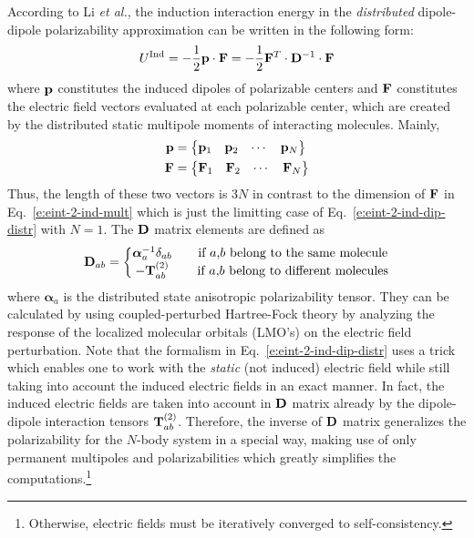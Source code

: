 \documentclass[a4paper,titlepage,twoside,fleqn,12pt]{book}
\newcommand{\BM}[1]{\bm{#1}}
\begin{document}
\begin{refsection}
According to Li \emph{et al.},\citep{Li.Netzloff.Gordon.JCP.2006} 
the induction interaction energy in the 
\emph{distributed} dipole\hyp{}dipole polarizability approximation 
can be written in the following form:
%
\begin{equation} \label{e:eint-2-ind-dip-distr}
U^{\rm Ind} = - \frac{1}{2} {\bf p} \cdot {\bf F} = - \frac{1}{2} {\bf F}^T \cdot {\bf D}^{-1} \cdot {\bf F}
\end{equation}
%
where ${\bf p}$ constitutes the induced dipoles of 
polarizable centers and ${\bf F}$ constitutes the electric field 
vectors evaluated at each polarizable center, which are created by the 
distributed static multipole moments of interacting molecules.
Mainly,
%
\begin{subequations} \label{e:pf}
\begin{align}
 {\bf p} &= 
 \begin{Bmatrix}
  {\bf p}_1 & {\bf p}_2 & \cdots & {\bf p}_N
 \end{Bmatrix} \\
 {\bf F}&= 
 \begin{Bmatrix}
  {\bf F}_1 & {\bf F}_2 & \cdots & {\bf F}_N
 \end{Bmatrix}
\end{align}
\end{subequations}
%
Thus, the length of these two vectors is $3N$ in contrast to the dimension
of $\bf F$ in Eq.~\eqref{e:eint-2-ind-mult} which is just the limitting case of 
Eq.~\eqref{e:eint-2-ind-dip-distr} with $N=1$.
The $\bf D$ matrix elements are defined as
%
\begin{equation} \label{e:D-matrix}
{\bf D}_{ab} = 
\left\{\begin{matrix}               
{\BM \alpha}_a^{-1} \delta_{ab} && \text{if $a$,$b$ belong to the same molecule} \\
-{\bf T}_{ab}^{(2)}             && \text{if $a$,$b$ belong to different molecules}
\end{matrix}\right. 
\end{equation}
%
where ${\BM \alpha}_a$ is the distributed state anisotropic polarizability
tensor. They can be calculated by using coupled\hyp{}perturbed Hartree\hyp{}Fock
theory by analyzing the response of the localized molecular orbitals
(LMO's) on the electric field perturbation. Note that the formalism
in Eq.~\eqref{e:eint-2-ind-dip-distr} uses a trick which enables one
to work with the \emph{static} (not induced) electric field while still taking
into account the induced electric fields in an exact manner. In fact,
the induced electric fields are taken into account in $\bf D$ matrix already
by the dipole\hyp{}dipole interaction tensors ${\bf T}_{ab}^{(2)}$.
Therefore, the inverse of $\bf D$ matrix generalizes
the polarizability for the $N$-body system in a special way, making use
of only permanent multipoles and polarizabilities which greatly simplifies
the computations.\footnote{Otherwise, electric fields must be iteratively converged to
self\hyp{}consistency.}


\end{refsection}
\end{document}
